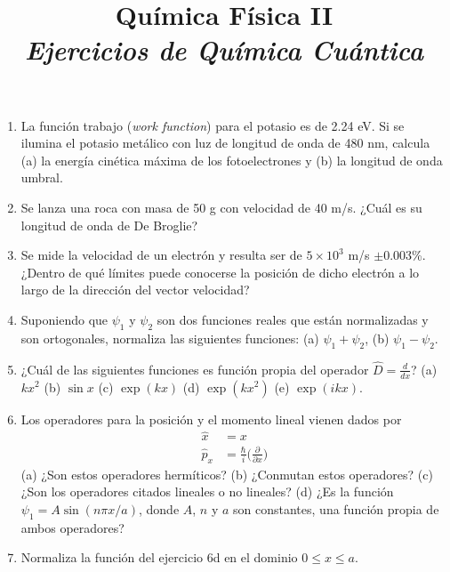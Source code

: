 \documentclass[a4paper, 11pt]{article}
\title{\huge\textsf{\textbf{Qu\'imica Física II}\\
\Large \textit{Ejercicios de Química Cuántica}}}
\date{}
\begin{document}
\maketitle
\large
\begin{enumerate}
    \item La función trabajo (\textit{work
    function}) para el potasio es de 2.24
    eV. Si se ilumina el potasio metálico
    con luz de longitud de onda de 480 nm,
    calcula (a) la energía cinética máxima
    de los fotoelectrones y (b) la longitud
    de onda umbral.
    
    \item Se lanza una roca con masa de 
    50 g con velocidad de 40 m/s. ¿Cuál es
    su longitud de onda de De Broglie?
    
    \item Se mide la velocidad de un
    electrón y resulta ser de $5\times10^3$
    m/s $\pm$0.003\%. ¿Dentro de qué
    límites puede conocerse la posición de
    dicho electrón a lo largo de la
    dirección del vector velocidad?
    
    \item Suponiendo que $\psi_1$ y
    $\psi_2$ son dos funciones reales que 
    están normalizadas y son ortogonales, 
    normaliza las siguientes funciones:
    (a) $\psi_1+\psi_2$, (b) 
    $\psi_1-\psi_2$.
    
    \item ¿Cuál de las siguientes funciones
    es función propia del operador
    $\hat{D}=\frac{d}{dx}$? (a) $kx^2$
    (b) $\sin x$ (c) $\exp (kx)$ 
    (d) $\exp(kx^2)$ (e) $\exp(ikx)$.
    
    \item Los operadores para la posición y
    el momento lineal vienen dados por 
    \begin{equation}
        \begin{array}{cc}
             \hat{x}& =x  \\
            \hat{p}_x& =\frac{\hbar}{i}\big(\frac{\partial}{\partial x}\big)
        \end{array}
    \end{equation}
    (a) ¿Son estos operadores hermíticos?
    (b) ¿Conmutan estos operadores?
    (c) ¿Son los operadores citados lineales
    o no lineales?
    (d) ¿Es la función $\psi_1=A\sin (n\pi
    x/a)$, donde $A$, $n$ y $a$ son
    constantes, una función propia de ambos
    operadores?
   
   \item Normaliza la función del ejercicio
   6d en el dominio $0\leq x\leq a$.
   

\end{enumerate}
\end{document}

